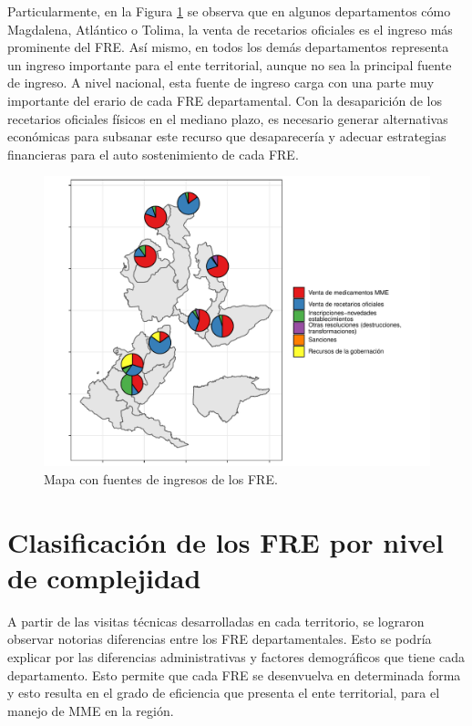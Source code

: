 \documentclass[
]{book}
\begin{document}
Particularmente, en la Figura \ref{fig:IngresosFRE2} se observa que en algunos departamentos cómo Magdalena, Atlántico o Tolima, la venta de recetarios oficiales es el ingreso más prominente del FRE. Así mismo, en todos los demás departamentos representa un ingreso importante para el ente territorial, aunque no sea la principal fuente de ingreso. A nivel nacional, esta fuente de ingreso carga con una parte muy importante del erario de cada FRE departamental. Con la desaparición de los recetarios oficiales físicos en el mediano plazo, es necesario generar alternativas económicas para subsanar este recurso que desaparecería y adecuar estrategias financieras para el auto sostenimiento de cada FRE.

\begin{figure}[th!]

{\centering \includegraphics[width=0.85\linewidth]{InformeFinal_files/figure-latex/IngresosFRE2-1} 

}

\caption{Mapa con fuentes de ingresos de los FRE.}\label{fig:IngresosFRE2}
\end{figure}

\hypertarget{clasificaciuxf3n-de-los-fre-por-nivel-de-complejidad}{%
\section{Clasificación de los FRE por nivel de complejidad}\label{clasificaciuxf3n-de-los-fre-por-nivel-de-complejidad}}

A partir de las visitas técnicas desarrolladas en cada territorio, se lograron observar notorias diferencias entre los FRE departamentales. Esto se podría explicar por las diferencias administrativas y factores demográficos que tiene cada departamento. Esto permite que cada FRE se desenvuelva en determinada forma y esto resulta en el grado de eficiencia que presenta el ente territorial, para el manejo de MME en la región.
\end{document}
